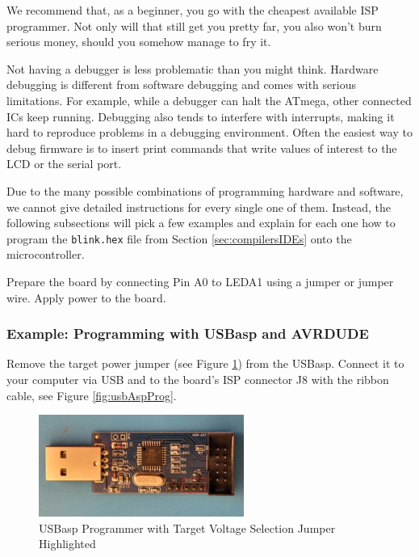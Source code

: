 \documentclass{article}
\newenvironment{note}{\begin{tcolorbox}[colback=blue!5!white,colframe=blue!75!black,title=\textbf{Note}]}{\end{tcolorbox}}
\newcommand{\file}[1]{\texttt{#1}}
\begin{document}
\begin{note}
We recommend that, as a beginner, you go with the cheapest available ISP programmer. Not only will that still get you pretty far, you also won't burn serious money, should you somehow manage to fry it. 

Not having a debugger is less problematic than you might think. Hardware debugging is different from software debugging and comes with serious limitations. For example, while a debugger can halt the ATmega, other connected ICs keep running. Debugging also tends to interfere with interrupts, making it hard to reproduce problems in a debugging environment. Often the easiest way to debug firmware is to insert print commands that write values of interest to the LCD or the serial port. 
\end{note}

Due to the many possible combinations of programming hardware and software, we cannot give detailed instructions for every single one of them. Instead, the following subsections will pick a few examples and explain for each one how to program the \file{blink.hex} file from Section \ref{sec:compilersIDEs} onto the microcontroller. 

Prepare the board by connecting Pin A0 to LEDA1 using a jumper or jumper wire. Apply power to the board.

\subsubsection{Example: Programming with USBasp and AVRDUDE}\label{sec:exUsbaspAvrdude}
Remove the target power jumper (see Figure \ref{fig:usbasp}) from the USBasp. Connect it to your computer via USB and to the board's ISP connector J8 with the ribbon cable, see Figure \ref{fig:usbAspProg}. 

\begin{figure}[htb]
\centering
\includegraphics[width=0.6\textwidth]{Pictures/USBasp.png}
\caption{USBasp Programmer with Target Voltage Selection Jumper Highlighted}
\label{fig:usbasp}
\end{figure}
\end{document}
